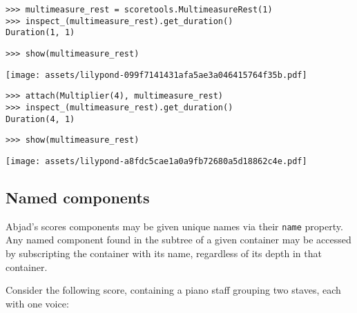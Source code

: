 \begin{abjadbookoutput}
\begin{singlespacing}
\vspace{-0.5\baselineskip}
\begin{lstlisting}
>>> multimeasure_rest = scoretools.MultimeasureRest(1)
>>> inspect_(multimeasure_rest).get_duration()
Duration(1, 1)
\end{lstlisting}
\begin{lstlisting}
>>> show(multimeasure_rest)
\end{lstlisting}
\noindent\texttt{[image: assets/lilypond-099f7141431afa5ae3a046415764f35b.pdf]}
\begin{lstlisting}
>>> attach(Multiplier(4), multimeasure_rest)
>>> inspect_(multimeasure_rest).get_duration()
Duration(4, 1)
\end{lstlisting}
\begin{lstlisting}
>>> show(multimeasure_rest)
\end{lstlisting}
\noindent\texttt{[image: assets/lilypond-a8fdc5cae1a0a9fb72680a5d18862c4e.pdf]}
\end{singlespacing}
\end{abjadbookoutput}

\subsection{Named components}

Abjad's scores components may be given unique names via their \texttt{name}
property. Any named component found in the subtree of a given container may be
accessed by subscripting the container with its name, regardless of its depth
in that container.

Consider the following score, containing a piano staff grouping two staves,
each with one voice:

\begin{comment}
<abjad>
voice_1 = Voice(name='Voice 1')
voice_1.append(Measure((3, 4), "d'4.. b'16 af'4"))
voice_1.append(Measure((5, 4), "af'4. g'8 c''8 b'4. b'8. d''16"))
upper_staff = Staff(
    [voice_1],
    name='Upper Staff',
    )
voice_2 = Voice(name='Voice 2')
voice_2.append(Measure((3, 4), "r8 c'8 r8 d8 r8 e8"))
voice_2.append(Measure((5, 4), r"r4 \times 2/3 { g4 fs4 e8 cs8 } r4. fs8"))
lower_staff = Staff(
    [voice_2],
    name='Lower Staff',
    )
staff_group = StaffGroup(
    [upper_staff, lower_staff],
    context_name='PianoStaff',
    name='Both Staves',
    )
score = Score([staff_group])
show(score)
</abjad>
\end{comment}

